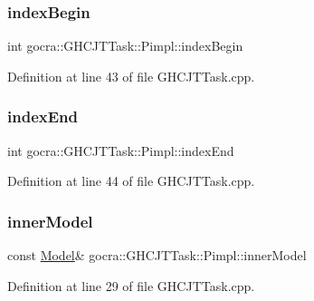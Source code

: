\subsubsection{\texorpdfstring{index\+Begin}{indexBegin}}
{\footnotesize\ttfamily int gocra\+::\+G\+H\+C\+J\+T\+Task\+::\+Pimpl\+::index\+Begin}



Definition at line 43 of file G\+H\+C\+J\+T\+Task.\+cpp.

\hypertarget{structgocra_1_1GHCJTTask_1_1Pimpl_ada601a59aeedcd018df465a5e2e79e03}{}\label{structgocra_1_1GHCJTTask_1_1Pimpl_ada601a59aeedcd018df465a5e2e79e03} 
\subsubsection{\texorpdfstring{index\+End}{indexEnd}}
{\footnotesize\ttfamily int gocra\+::\+G\+H\+C\+J\+T\+Task\+::\+Pimpl\+::index\+End}



Definition at line 44 of file G\+H\+C\+J\+T\+Task.\+cpp.

\hypertarget{structgocra_1_1GHCJTTask_1_1Pimpl_a7f03506d78950aa1a986d2ba44142f28}{}\label{structgocra_1_1GHCJTTask_1_1Pimpl_a7f03506d78950aa1a986d2ba44142f28} 
\subsubsection{\texorpdfstring{inner\+Model}{innerModel}}
{\footnotesize\ttfamily const \hyperlink{classocra_1_1Model}{Model}\& gocra\+::\+G\+H\+C\+J\+T\+Task\+::\+Pimpl\+::inner\+Model}



Definition at line 29 of file G\+H\+C\+J\+T\+Task.\+cpp.

\hypertarget{structgocra_1_1GHCJTTask_1_1Pimpl_a1faaaea4991fa4a0bec914732c189fd3}{}\label{structgocra_1_1GHCJTTask_1_1Pimpl_a1faaaea4991fa4a0bec914732c189fd3} 
